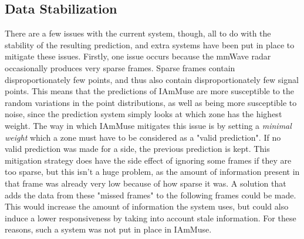 
\subsection{Data Stabilization}
\label{sub-section: tracking method - data interpretation - data stabilization}

There are a few issues with the current system, though, all to do with the stability of the resulting prediction, and extra systems have been put in place to mitigate these issues.
Firstly, one issue occurs because the mmWave radar occasionally produces very sparse frames. 
Sparse frames contain disproportionately few points, and thus also contain disproportionately few signal points. 
This means that the predictions of IAmMuse are more susceptible to the random variations in the point distributions, as well as being more susceptible to noise, since the prediction system simply looks at which zone has the highest weight.
The way in which IAmMuse mitigates this issue is by setting a \textit{minimal weight} which a zone must have to be considered as a "valid prediction". 
If no valid prediction was made for a side, the previous prediction is kept.
This mitigation strategy does have the side effect of ignoring some frames if they are too sparse, but this isn't a huge problem, as the amount of information present in that frame was already very low because of how sparse it was.
A solution that adds the data from these "missed frames" to the following frames could be made.
This would increase the amount of information the system uses, but could also induce a lower responsiveness by taking into account stale information.
For these reasons, such a system was not put in place in IAmMuse.


